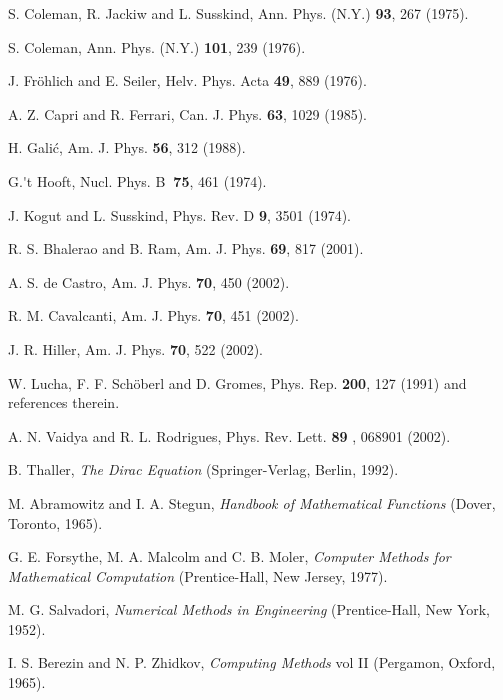 \documentclass[a4paper,12pt,titlepage]{article}
\begin{document}
\begin{thebibliography}{99}
  S. Coleman, R. Jackiw and L. Susskind, Ann. Phys. (N.Y.)
\textbf{93}, 267 (1975).

  S. Coleman, Ann. Phys. (N.Y.) \textbf{101}, 239 (1976).

  J. Fr\"{o}hlich and E. Seiler, Helv. Phys. Acta \textbf{49},
889 (1976).

  A. Z. Capri and R. Ferrari, Can. J. Phys. \textbf{63}, 1029
(1985).

  H. Gali\'{c}, Am. J. Phys. \textbf{56}, 312 (1988).

  G.\'{}t Hooft, Nucl. Phys. B\textbf{\ 75}, 461 (1974).

  J. Kogut and L. Susskind, Phys. Rev. D \textbf{9}, 3501
(1974).

  R. S. Bhalerao and B. Ram, Am. J. Phys. \textbf{69}, 817
(2001).

  A. S. de Castro, Am. J. Phys. \textbf{70}, 450 (2002).

  R. M. Cavalcanti, Am. J. Phys. \textbf{70}, 451 (2002).

  J. R. Hiller, Am. J. Phys. \textbf{70}, 522 (2002).

  W. Lucha, F. F. Sch\"{o}berl and D. Gromes, Phys. Rep.
\textbf{200}, 127 (1991) and references therein.

  A. N. Vaidya and R. L. Rodrigues, Phys. Rev. Lett. \textbf{89}%
, 068901 (2002).

  B. Thaller, \textit{The Dirac Equation} (Springer-Verlag,
Berlin, 1992).

  M. Abramowitz and I. A. Stegun, \textit{Handbook of
Mathematical Functions} (Dover, Toronto, 1965).

  G. E. Forsythe, M. A. Malcolm and C. B. Moler, \textit{%
Computer Methods for Mathematical Computation} (Prentice-Hall, New Jersey,
1977).

  M. G. Salvadori, \textit{Numerical Methods in Engineering}
(Prentice-Hall, New York, 1952).

  I. S. Berezin and N. P. Zhidkov, \textit{Computing Methods}
vol II (Pergamon, Oxford, 1965).
\end{thebibliography}
\end{document}
